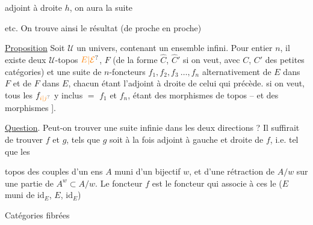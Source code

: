 adjoint à droite $h$, on aura la suite 


etc. On trouve ainsi le résultat (de proche en proche)

\uline{Proposition} Soit $\mathcal U$ un univers,  contenant
un ensemble infini. Pour  entier $n$,
il existe deux $\mathcal U$-topos $\unsure{E|\mathcal E}$, $F$
(de la forme $\hat C$, $\hat C'$ si on veut, avec
$C$, $C'$ des petites catégories) et une
suite de $n$-foncteurs  $f_1,f_2,f_3\ \ldots,f_n$
alternativement de $E$ dans $F$ et de $F$ dans $E$,
chacun étant l'adjoint à droite de celui
qui précède.  si on veut, tous les $f_{\unsure{i|j}}$
y inclus $=$ $f_1$ et $f_n$, étant des morphismes
de topos -- et \unsure{$=$} des morphismes ].

\uline{Question}. Peut-on trouver une suite infinie
dans les deux directions ? Il suffirait de
trouver $f$ et $g$, tels que $g$ soit à la fois adjoint
à gauche et  droite de $f$, i.e. tel que les


topos   des couples d'un
ens $A$  muni d'un  bijectif $w$,
et d'une rétraction de $A/w$ sur une
partie  de $A^w\subset A/w$. Le foncteur $f$
est le foncteur qui associe à ces
 le  ($E$ muni de $\mathrm{id}_E$, $E$, $\mathrm{id}_E$)


Catégories fibrées

